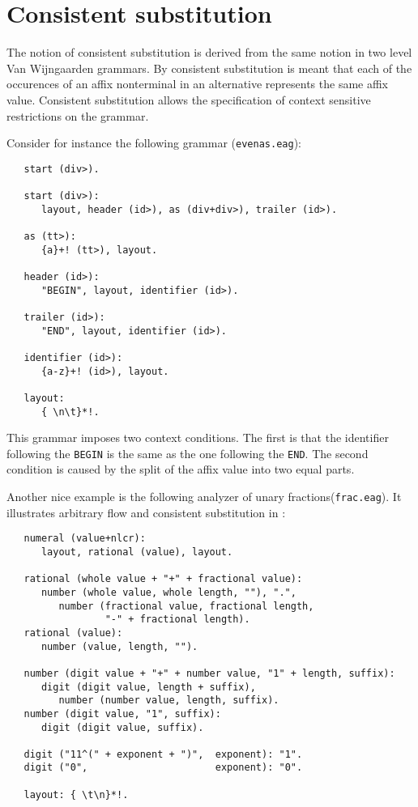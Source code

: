 \section {Consistent substitution}
The notion of consistent substitution is derived from the same
notion in two level Van Wijngaarden grammars. By consistent
substitution is meant that each of the occurences of an affix
nonterminal in an alternative represents the same affix value.
Consistent substitution allows the specification of context
sensitive restrictions on the grammar.

Consider for instance the following grammar ({\tt evenas.eag}):
\begin{verbatim}
   start (div>).

   start (div>):
      layout, header (id>), as (div+div>), trailer (id>).

   as (tt>):
      {a}+! (tt>), layout.

   header (id>):
      "BEGIN", layout, identifier (id>).

   trailer (id>):
      "END", layout, identifier (id>).

   identifier (id>):
      {a-z}+! (id>), layout.

   layout:
      { \n\t}*!.
\end{verbatim}
This grammar imposes two context conditions. The first is
that the identifier following the {\tt BEGIN} is the same
as the one following the {\tt END}. The second condition
is caused by the split of the affix value into two equal
parts.

Another nice example is the following analyzer of unary
fractions\linebreak ({\tt frac.eag}). It illustrates arbitrary flow
and consistent substitution in \EAGns:
\begin{verbatim}
   numeral (value+nlcr):
      layout, rational (value), layout.

   rational (whole value + "+" + fractional value):
      number (whole value, whole length, ""), ".",
         number (fractional value, fractional length,
                 "-" + fractional length).
   rational (value):
      number (value, length, "").

   number (digit value + "+" + number value, "1" + length, suffix):
      digit (digit value, length + suffix),
         number (number value, length, suffix).
   number (digit value, "1", suffix):
      digit (digit value, suffix).

   digit ("11^(" + exponent + ")",  exponent): "1".
   digit ("0",                      exponent): "0".

   layout: { \t\n}*!.
\end{verbatim}
